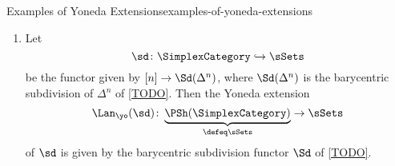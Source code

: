 \begin{example}{Examples of Yoneda Extensions}{examples-of-yoneda-extensions}
\begin{enumerate}
\[                \Lan_{\yo}(\iota)%
                \colon%
                \underbrace{\PSh(\SimplexCategory)}_{\defeq\sSets}%
                \to%
                \sCats%
            \]%
            of $\iota$ is given by the path simplicial category functor $\Path$ of .
        \item\label{examples-of-yoneda-extensions-the-barycenteric-subdivision-functor}Let
            \[
                \sd%
                \colon%
                \SimplexCategory%
                \hookrightarrow%
                \sSets%
            \]%
            be the functor given by $[n]\to\Sd(\Delta^{n})$, where $\Sd(\Delta^{n})$ is the barycentric subdivision of $\Delta^{n}$ of \cref{TODO}. Then the Yoneda extension
            \[
                \Lan_{\yo}(\sd)%
                \colon%
                \underbrace{\PSh(\SimplexCategory)}_{\defeq\sSets}%
                \to%
                \sSets%
            \]%
            of $\sd$ is given by the barycentric subdivision functor $\Sd$ of \cref{TODO}.
    \end{enumerate}
\end{example}
